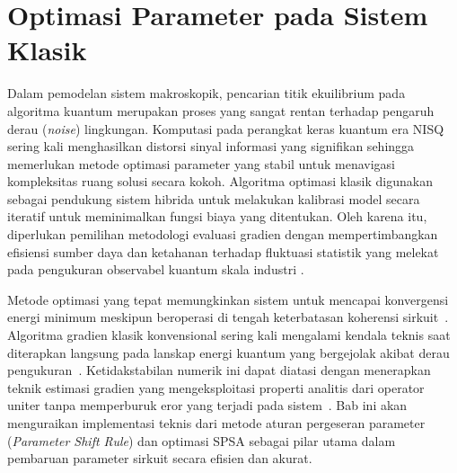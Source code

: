 \section{Optimasi Parameter pada Sistem Klasik}
Dalam pemodelan sistem makroskopik, pencarian titik ekuilibrium pada algoritma kuantum merupakan proses yang sangat rentan terhadap pengaruh derau (\textit{noise}) lingkungan. Komputasi pada perangkat keras kuantum era NISQ sering kali menghasilkan distorsi sinyal informasi yang signifikan sehingga memerlukan metode optimasi parameter yang stabil untuk menavigasi kompleksitas ruang solusi secara kokoh. Algoritma optimasi klasik digunakan sebagai pendukung sistem hibrida untuk melakukan kalibrasi model secara iteratif untuk meminimalkan fungsi biaya yang ditentukan. Oleh karena itu, diperlukan pemilihan metodologi evaluasi gradien dengan mempertimbangkan efisiensi sumber daya dan ketahanan terhadap fluktuasi statistik yang melekat pada pengukuran observabel kuantum skala industri \cite{spall_implementation_1998}.

Metode optimasi yang tepat memungkinkan sistem untuk mencapai konvergensi energi minimum meskipun beroperasi di tengah keterbatasan koherensi sirkuit~. Algoritma gradien klasik konvensional sering kali mengalami kendala teknis saat diterapkan langsung pada lanskap energi kuantum yang bergejolak akibat derau pengukuran~. Ketidakstabilan numerik ini dapat diatasi dengan menerapkan teknik estimasi gradien yang mengeksploitasi properti analitis dari operator uniter tanpa memperburuk eror yang terjadi pada sistem~. Bab ini akan menguraikan implementasi teknis dari metode aturan pergeseran parameter (\textit{Parameter Shift Rule}) dan optimasi SPSA sebagai pilar utama dalam pembaruan parameter sirkuit secara efisien dan akurat.

